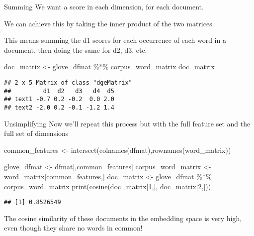 \documentclass[
  10pt,
  ignorenonframetext,
  aspectratio=169]{beamer}
\newenvironment{Shaded}{\begin{snugshade}}{\end{snugshade}}
\newcommand{\DecValTok}[1]{\textcolor[rgb]{0.86,0.86,0.80}{#1}}
\newcommand{\FunctionTok}[1]{\textcolor[rgb]{0.94,0.94,0.56}{#1}}
\newcommand{\NormalTok}[1]{\textcolor[rgb]{0.80,0.80,0.80}{#1}}
\newcommand{\OtherTok}[1]{\textcolor[rgb]{0.94,0.94,0.56}{#1}}
\newcommand{\SpecialCharTok}[1]{\textcolor[rgb]{0.86,0.64,0.64}{#1}}
\begin{document}
\begin{frame}[fragile]{Summing}
\protect\hypertarget{summing}{}
We want a score in each dimension, for each document.

We can achieve this by taking the inner product of the two matrices.

This means summing the d1 scores for each occurrence of each word in a
document, then doing the same for d2, d3, etc.

\medskip

\scriptsize

\begin{Shaded}
\begin{Highlighting}[]
\NormalTok{doc\_matrix }\OtherTok{\textless{}{-}}\NormalTok{ glove\_dfmat }\SpecialCharTok{\%*\%}\NormalTok{ corpus\_word\_matrix}
\NormalTok{doc\_matrix}
\end{Highlighting}
\end{Shaded}

\begin{verbatim}
## 2 x 5 Matrix of class "dgeMatrix"
##         d1  d2   d3   d4  d5
## text1 -0.7 0.2 -0.2  0.0 2.0
## text2 -2.0 0.2 -0.1 -1.2 1.4
\end{verbatim}
\end{frame}

\begin{frame}[fragile]{Unsimplifying}
\protect\hypertarget{unsimplifying}{}
Now we'll repeat this process but with the full feature set and the full
set of dimensions

\medskip

\scriptsize

\begin{Shaded}
\begin{Highlighting}[]
\NormalTok{common\_features }\OtherTok{\textless{}{-}} \FunctionTok{intersect}\NormalTok{(}\FunctionTok{colnames}\NormalTok{(dfmat),}\FunctionTok{rownames}\NormalTok{(word\_matrix))}

\NormalTok{glove\_dfmat }\OtherTok{\textless{}{-}}\NormalTok{ dfmat[,common\_features]}
\NormalTok{corpus\_word\_matrix }\OtherTok{\textless{}{-}}\NormalTok{ word\_matrix[common\_features,]}
\NormalTok{doc\_matrix }\OtherTok{\textless{}{-}}\NormalTok{ glove\_dfmat }\SpecialCharTok{\%*\%}\NormalTok{ corpus\_word\_matrix}
\FunctionTok{print}\NormalTok{(}\FunctionTok{cosine}\NormalTok{(doc\_matrix[}\DecValTok{1}\NormalTok{,], doc\_matrix[}\DecValTok{2}\NormalTok{,]))}
\end{Highlighting}
\end{Shaded}

\begin{verbatim}
## [1] 0.8526549
\end{verbatim}

\medskip

\normalsize

The cosine similarity of these documents in the embedding space is very
high, even though they share no words in common!
\end{frame}
\end{document}
